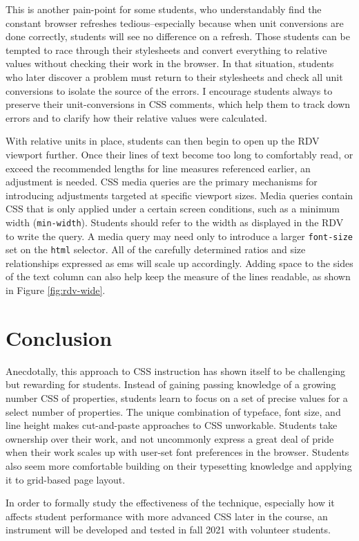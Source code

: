 \documentclass[sigplan,screen]{acmart}
\begin{document}
This is another pain-point for some students, who understandably find the constant browser refreshes tedious--especially because when unit conversions are done correctly, students will see no difference on a refresh. Those students can be tempted to race through their stylesheets and convert everything to relative values without checking their work in the browser. In that situation, students who later discover a problem must return to their stylesheets and check all unit conversions to isolate the source of the errors. I encourage students always to preserve their unit-conversions in CSS comments, which help them to track down errors and to clarify how their relative values were calculated.

With relative units in place, students can then begin to open up the RDV viewport further. Once their lines of text become too long to comfortably read, or exceed the recommended lengths for line measures referenced earlier, an adjustment is needed. CSS media queries are the primary mechanisms for introducing adjustments targeted at specific viewport sizes. Media queries contain CSS that is only applied under a certain screen conditions, such as a minimum width (\verb|min-width|). Students should refer to the width as displayed in the RDV to write the query. A media query may need only to introduce a larger \verb|font-size| set on the \verb|html| selector. All of the carefully determined ratios and size relationships expressed as ems will scale up accordingly. Adding space to the sides of the text column can also help keep the measure of the lines readable, as shown in Figure \ref{fig:rdv-wide}.

\section{Conclusion}

Anecdotally, this approach to CSS instruction has shown itself to be challenging but rewarding for students. Instead of gaining passing knowledge of a growing number CSS of properties, students learn to focus on a set of precise values for a select number of properties. The unique combination of typeface, font size, and line height makes cut-and-paste approaches to CSS unworkable. Students take ownership over their work, and not uncommonly express a great deal of pride when their work scales up with user-set font preferences in the browser. Students also seem more comfortable building on their typesetting knowledge and applying it to grid-based page layout.

In order to formally study the effectiveness of the technique, especially  how it affects student performance with more advanced CSS later in the course, an instrument will be developed and tested in fall 2021 with volunteer students.



\end{document}
